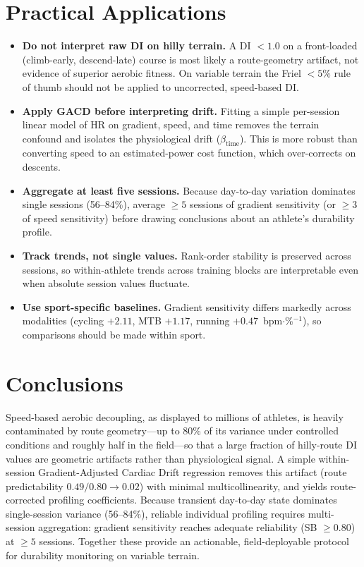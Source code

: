 \documentclass[12pt]{article}
\begin{document}
\section{Practical Applications}
\begin{itemize}
  \item \textbf{Do not interpret raw DI on hilly terrain.} A DI $< 1.0$ on
  a front-loaded (climb-early, descend-late) course is most likely a
  route-geometry artifact, not evidence of superior aerobic fitness. On
  variable terrain the Friel $<5\%$ rule of thumb should not be applied to
  uncorrected, speed-based DI.
  \item \textbf{Apply GACD before interpreting drift.} Fitting a simple
  per-session linear model of HR on gradient, speed, and time removes the
  terrain confound and isolates the physiological drift
  ($\beta_{\mathrm{time}}$). This is more robust than converting speed to
  an estimated-power cost function, which over-corrects on descents.
  \item \textbf{Aggregate at least five sessions.} Because day-to-day
  variation dominates single sessions (56--84\%), average $\geq 5$
  sessions of gradient sensitivity (or $\geq 3$ of speed sensitivity)
  before drawing conclusions about an athlete's durability profile.
  \item \textbf{Track trends, not single values.} Rank-order stability is
  preserved across sessions, so within-athlete trends across training
  blocks are interpretable even when absolute session values fluctuate.
  \item \textbf{Use sport-specific baselines.} Gradient sensitivity
  differs markedly across modalities (cycling $+2.11$, MTB $+1.17$,
  running $+0.47$~bpm$\cdot$\%$^{-1}$), so comparisons should be made
  within sport.
\end{itemize}

\section{Conclusions}
Speed-based aerobic decoupling, as displayed to millions of athletes, is
heavily contaminated by route geometry---up to 80\% of its variance under
controlled conditions and roughly half in the field---so that a large
fraction of hilly-route DI values are geometric artifacts rather than
physiological signal. A simple within-session Gradient-Adjusted Cardiac
Drift regression removes this artifact (route predictability
$0.49/0.80\rightarrow0.02$) with minimal multicollinearity, and yields
route-corrected profiling coefficients. Because transient day-to-day state
dominates single-session variance (56--84\%), reliable individual
profiling requires multi-session aggregation: gradient sensitivity reaches
adequate reliability (SB $\geq 0.80$) at $\geq 5$ sessions. Together these
provide an actionable, field-deployable protocol for durability monitoring
on variable terrain.
\end{document}
